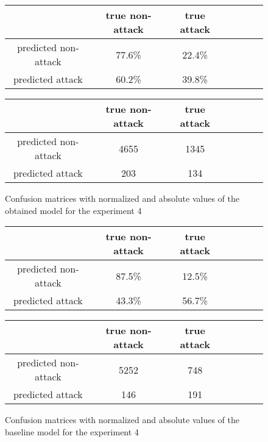 \documentclass{article}
\begin{document}
\begin{figure}[h!]
    \centering
    \begin{tabular}{ |c|c|c|c|c|c|c| }
     \hline
      & true non-attack & true attack \\
     \hline
     predicted non-attack & 77.6\% & 22.4\% \\
     \hline
     predicted attack & 60.2\% & 39.8\% \\
     \hline
    \end{tabular}

    \vspace{0.2cm}

    \centering
    \begin{tabular}{ |c|c|c|c|c|c|c| }
     \hline
      & true non-attack & true attack \\
     \hline
     predicted non-attack & 4655 & 1345 \\
     \hline
     predicted attack & 203 & 134 \\
     \hline
    \end{tabular}
    \caption{Confusion matrices with normalized and absolute values of the obtained model for the experiment 4}
    \label{fig-exp4-transcriptions}
\end{figure}


\begin{figure}[h!]
    \centering
    \begin{tabular}{ |c|c|c|c|c|c|c| }
     \hline
      & true non-attack & true attack \\
     \hline
     predicted non-attack & 87.5\% & 12.5\% \\
     \hline
     predicted attack & 43.3\% & 56.7\% \\
     \hline
    \end{tabular}

    \vspace{0.2cm}

    \centering
    \begin{tabular}{ |c|c|c|c|c|c|c| }
     \hline
      & true non-attack & true attack \\
     \hline
     predicted non-attack & 5252 & 748 \\
     \hline
     predicted attack & 146 & 191 \\
     \hline
    \end{tabular}
    \caption{Confusion matrices with normalized and absolute values of the baseline model for the experiment 4}
    \label{fig-exp4-baseline}
\end{figure}
\end{document}
